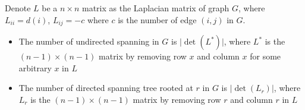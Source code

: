 Denote $L$ be a $n \times n$ matrix as the Laplacian matrix of graph $G$, where $L_{ii} = d(i)$, $L_{ij} = -c$ where $c$ is the number of edge $(i, j)$ in $G$.
\begin{itemize}
    \item The number of undirected spanning in $G$ is $\lvert \det(L^{*}) \rvert$, where $L^{*}$ is the $(n - 1)\times (n - 1)$ matrix by removing row $x$ and column $x$ for some arbitrary $x$ in $L$
    \item The number of directed spanning tree rooted at $r$ in $G$ is $\lvert \det(L_r) \rvert$, where $L_r$ is the $(n - 1)\times (n - 1)$ matrix by removing row $r$ and column $r$ in $L$
\end{itemize}
